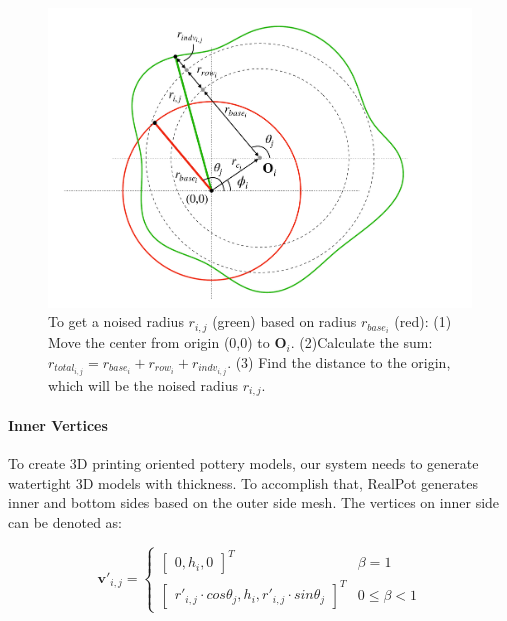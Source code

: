 \documentclass{svjour3}                     %
\begin{document}
\begin{figure}
\includegraphics[width=\textwidth]{fig5.pdf}
\caption{To get a noised radius $r_{i,j}$ (green) based on radius $r_{base_{i}}$ (red): (1) Move the center from origin (0,0) to $\mathbf{O}_{i}$. (2)Calculate the sum: $r_{total_{i,j}} = r_{base_{i}} + r_{row_{i}} + r_{indv_{i,j}}$. (3) Find the distance to the origin, which will be the noised radius $r_{i,j}$.}
\label{fig:noise}
\end{figure}

\paragraph{Inner Vertices} To create 3D printing oriented pottery models, our system needs to generate watertight 3D models with thickness.
To accomplish that, RealPot generates inner and bottom sides based on the outer side mesh. The vertices on inner side can be denoted as:

\begin{equation}
\label{eqn:v'}
\mathbf{v'}_{i,j} 
= \begin{cases}
\begin{bmatrix}
0,h_{i},0
\end{bmatrix}^T & \beta=1
\\
\begin{bmatrix}
r'_{i,j} \cdot cos \theta_{j},
h_{i},
r'_{i,j} \cdot sin \theta_{j}
\end{bmatrix}^T & 0 \le \beta<1
\end{cases}
\end{equation}
\end{document}

